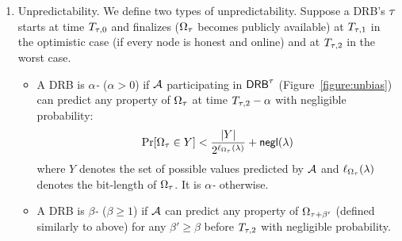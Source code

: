 \begin{definition}
\begin{enumerate}
\item Unpredictability.
We define two types of unpredictability.
Suppose a DRB's \epoch $\tau$ starts at time $T_{\tau, 0}$ and finalizes ($\Omega_\tau$ becomes publicly available) at $T_{\tau, 1}$ in the optimistic case (if every node is honest and online) and at $T_{\tau, 2}$ in the worst case.
\begin{itemize}
\item A DRB is \textit{$\alpha$-\intraunpredictable} ($\alpha > 0$) if $\mathcal{A}$ participating in $\mathsf{DRB}^\tau$ (Figure~\ref{figure:unbias}) can predict any property of $\Omega_\tau$ at time $T_{\tau, 2} - \alpha$ with negligible probability:
\begin{equation*}
\Pr[\Omega_\tau \in Y] < \frac{|Y|}{2^{\ell_{\Omega_\tau}(\lambda)}} + \mathsf{negl}(\lambda)
\end{equation*}
where $Y$ denotes the set of possible values predicted by $\mathcal{A}$ and $\ell_{\Omega_\tau}(\lambda)$ denotes the bit-length of $\Omega_\tau$.
It is \textit{$\alpha$-\intrapredictable} otherwise.
\item A DRB is \textit{$\beta$-\interunpredictable} ($\beta \geq 1$) if $\mathcal{A}$ can predict any property of $\Omega_{\tau + \beta'}$ (defined similarly to above) for any $\beta' \geq \beta$ before $T_{\tau, 2}$ with negligible probability.
\end{itemize}
\end{enumerate}
\end{definition}

